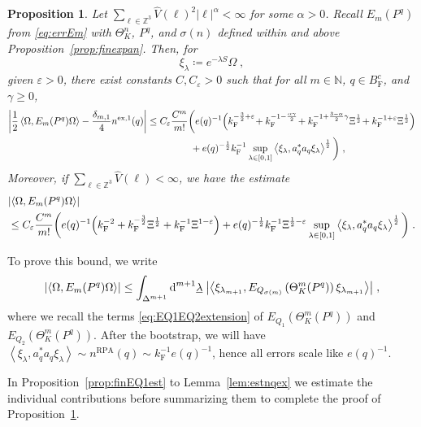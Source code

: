 \documentclass[12pt,a4paper]{article}
\numberwithin{equation}{section}
\newcommand{\NNN}{\mathbb{N}}
\newcommand{\1}{\mathbb{I}}
\newcommand{\di}{\textnormal{d}}
\newcommand{\ex}{\mathrm{ex}}
\newcommand{\F}{\mathrm{F}}
\newcommand{\RPA}{\mathrm{RPA}}
\newcommand{\kF}{k_\F}
\newcommand{\Zstar}{\mathbb{Z}^3} %
\newcommand{\Z}{\mathbb{Z}}
\newcommand{\half}{\frac{1}{2}}
\newcommand{\eva}[1]{\left\langle #1 \right\rangle}
\theoremstyle{plain}
\newtheorem{proposition}[theorem]{Proposition}
\theoremstyle{definition}
\theoremstyle{remark}
\theoremstyle{plain}
\theoremstyle{definition}
\theoremstyle{remark}
\begin{document}
\begin{proposition} \label{prop:finalEmest}
Let $ \sum_{\ell \in \Zstar} \hat{V}(\ell)^2 |\ell|^\alpha < \infty $ for some $ \alpha > 0 $. Recall $E_m(P^q)$ from \eqref{eq:errEm} with $ \Theta^n_K $, $ P^q $, and $ \sigma(n) $ defined within and above Proposition~\ref{prop:finexpan}. Then, for
\[
	\xi_\lambda \coloneq e^{- \lambda S} \Omega \;,
\]
given $ \varepsilon > 0 $, there exist constants $ C, C_\varepsilon > 0 $ such that for all $ m \in \NNN $, $ q \in B_{\F}^c $, and $ \gamma \ge 0 $,
\begin{align} \label{eq:finalEmest_Coulomb}
	\abs{\half \eva{\Omega, E_m(P^q) \Omega} - \frac{\delta_{m,1}}{4} n^{\ex,1}(q)}
	&\leq C_\varepsilon \frac{C^m}{m!}
		\bigg( e(q)^{-1}\!\left( \kF^{-\frac 32 + \varepsilon}
		\!+ \kF^{-1 - \frac{\alpha \gamma}{2}}
		\!+ \kF^{-1 + \frac{3-\alpha}{2} \gamma} \Xi^\half
		\!+ \kF^{-1+\varepsilon} \Xi^\half \right) \nonumber\\
	&\hspace{4.5em} + e(q)^{-\half} \kF^{-1} \sup_{\lambda \in [0,1]} \eva{\xi_\lambda, a_q^* a_q \xi_\lambda}^{\half} \bigg) \;,
\end{align}
Moreover, if $ \sum_{\ell \in \Zstar} \hat{V}(\ell) < \infty $, we have the estimate
\begin{align} \label{eq:finalEmest}
	&\abs{\eva{\Omega, E_m(P^q) \Omega}} \nonumber\\
	&\leq C_\varepsilon \frac{C^m}{m!}
		\bigg( e(q)^{-1}
		\Big( \kF^{-2}
		+ \kF^{-\frac{3}{2}} \Xi^\half
		+ \kF^{-1} \Xi^{1-\varepsilon} \Big)
		+ e(q)^{-\half} \kF^{-1} \Xi^{\half - \varepsilon}
		\sup_{\lambda \in [0,1]} \eva{\xi_\lambda, a_q^* a_q \xi_\lambda}^{\half}  \bigg)\;.
\end{align}
\end{proposition}

To prove this bound, we write
\begin{equation} \label{eq:errEm2}
	\abs{\eva{\Omega, E_m(P^q) \Omega }}
	\le \int_{\Delta^{m+1}} \di^{m+1} \underline{\lambda} \;
		\abs{\eva{\xi_{\lambda_{m+1}}, E_{Q_{\sigma(m)}}\left(\Theta^{m}_{K}(P^q)\right) \xi_{\lambda_{m+1}}}} \;,
\end{equation}
where we recall the terms \eqref{eq:EQ1EQ2extension} of $ E_{Q_1}(\Theta^m_{K}(P^q)) $ and $ E_{Q_2}(\Theta^m_{K}(P^q)) $.
After the bootstrap, we will have $ \eva{\xi_\lambda, a_q^* a_q \xi_\lambda} \sim n^{\RPA}(q) \sim \kF^{-1} e(q)^{-1} $, hence all errors scale like $ e(q)^{-1} $.

In Proposition~\ref{prop:finEQ1est} to Lemma~\ref{lem:estnqex} we estimate the individual contributions before summarizing them to complete the proof of Proposition~\ref{prop:finalEmest}.
\end{document}
